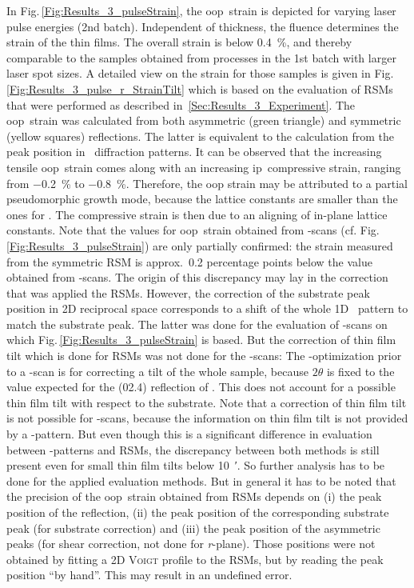 In Fig.\,\ref{Fig:Results_3_pulseStrain}, the \gls{oop}\ strain is depicted for varying laser pulse energies (2nd batch).
Independent of thickness, the fluence determines the strain of the thin films.
The overall strain is below \qty{0.4}{\percent}, and thereby comparable to the samples obtained from processes in the 1st batch with larger laser spot sizes.
A detailed view on the strain for those samples is given in Fig.\,\ref{Fig:Results_3_pulse_r_StrainTilt} which is based on the evaluation of \glspl{RSM} that were performed as described in~\ref{Sec:Results_3_Experiment}.
The \gls{oop}\ strain was calculated from both asymmetric (green triangle) and symmetric (yellow squares) reflections.
The latter is equivalent to the calculation from the peak position in \thetaomega\ diffraction patterns.
It can be observed that the increasing tensile \gls{oop}\ strain comes along with an increasing \gls{ip}\ compressive strain, ranging from \qty{-0.2}{\percent} to \qty{-0.8}{\percent}.
Therefore, the \gls{oop} strain may be attributed to a partial pseudomorphic growth mode, because the  lattice constants are smaller than the ones for \cro.
The compressive strain is then due to an aligning of in-plane lattice constants.
Note that the values for \gls{oop}\ strain obtained from \thetaomega-scans (cf. Fig.\,\ref{Fig:Results_3_pulseStrain}) are only partially confirmed:
the strain measured from the symmetric \gls{RSM} is approx.\ 0.2 percentage points below the value obtained from \thetaomega-scans.
The origin of this discrepancy may lay in the correction that was applied the \glspl{RSM}.
However, the correction of the substrate peak position in 2D reciprocal space corresponds to a shift of the whole 1D \thetaomega\ pattern to match the substrate peak.
The latter was done for the evaluation of \thetaomega-scans on which Fig.\,\ref{Fig:Results_3_pulseStrain} is based.
But the correction of thin film tilt which is done for \glspl{RSM} was not done for the \thetaomega-scans: The \textomega-optimization prior to a \thetaomega-scan is for correcting a tilt of the whole sample, because $2\theta$ is fixed to the value expected for the (02.4) reflection of .
This does not account for a possible thin film tilt with respect to the substrate.
Note that a correction of thin film tilt is not possible for \thetaomega-scans, because the information on thin film tilt is not provided by a \thetaomega-pattern.
But even though this is a significant difference in evaluation between \thetaomega-patterns and \glspl{RSM}, the discrepancy between both methods is still present even for small thin film tilts below \qty{10}{\arcminute}.
So further analysis has to be done for the applied evaluation methods.
But in general it has to be noted that the precision of the \gls{oop}\ strain obtained from \glspl{RSM} depends on (i) the peak position of the reflection, (ii) the peak position of the corresponding substrate peak (for substrate correction) and (iii) the peak position of the asymmetric peaks (for shear correction, not done for \textit{r}-plane).
Those positions were not obtained by fitting a 2D \textsc{Voigt} profile to the \glspl{RSM}, but by reading the peak position \enquote{by hand}.
This may result in an undefined error.

